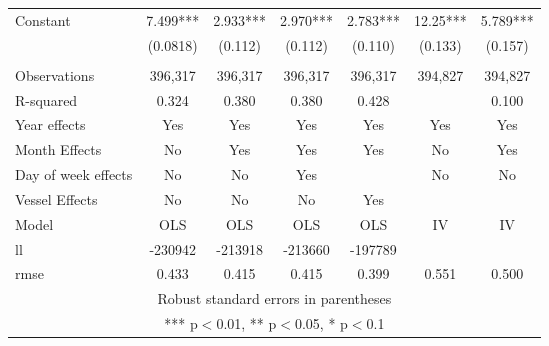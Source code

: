 \begin{tabular}{lcccccc}
Constant & 7.499*** & 2.933*** & 2.970*** & 2.783*** & 12.25*** & 5.789*** \\
 & (0.0818) & (0.112) & (0.112) & (0.110) & (0.133) & (0.157) \\
 &  &  &  &  &  &  \\
Observations & 396,317 & 396,317 & 396,317 & 396,317 & 394,827 & 394,827 \\
R-squared & 0.324 & 0.380 & 0.380 & 0.428 &  & 0.100 \\
Year effects & Yes & Yes & Yes & Yes & Yes & Yes \\
Month Effects & No & Yes & Yes & Yes & No & Yes \\
Day of week effects & No & No & Yes &  & No & No \\
Vessel Effects & No & No & No & Yes &  &  \\
Model & OLS & OLS & OLS & OLS & IV & IV \\
ll & -230942 & -213918 & -213660 & -197789 &  &  \\
 rmse & 0.433 & 0.415 & 0.415 & 0.399 & 0.551 & 0.500 \\ \hline
\multicolumn{7}{c}{ Robust standard errors in parentheses} \\
\multicolumn{7}{c}{ *** p$<$0.01, ** p$<$0.05, * p$<$0.1} \\
\end{tabular}
